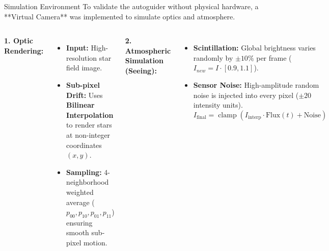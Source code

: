 \begin{frame}{Simulation Environment}
    To validate the autoguider without physical hardware, a **Virtual Camera** was implemented to simulate optics and atmosphere.

    \begin{columns}
        \textbf{1. Optic Rendering:}
        \begin{itemize}
            \item \textbf{Input:} High-resolution star field image.
            \item \textbf{Sub-pixel Drift:} Uses \textbf{Bilinear Interpolation} to render stars at non-integer coordinates $(x,y)$.
            \item \textbf{Sampling:} 4-neighborhood weighted average ($p_{00}, p_{10}, p_{01}, p_{11}$) ensuring smooth sub-pixel motion.
        \end{itemize}

        \vspace{0.3cm}
        \textbf{2. Atmospheric Simulation (Seeing):}
        \begin{itemize}
            \item \textbf{Scintillation:} Global brightness varies randomly by $\pm 10\%$ per frame ($I_{new} = I \cdot [0.9, 1.1]$).
            \item \textbf{Sensor Noise:} High-amplitude random noise is injected into every pixel ($\pm 20$ intensity units).
             \[ I_{\text{final}} = \operatorname{clamp}(I_{\text{interp}} \cdot \text{Flux}(t) + \text{Noise}) \]
        \end{itemize}

        \centering
\end{columns}
\end{frame}
